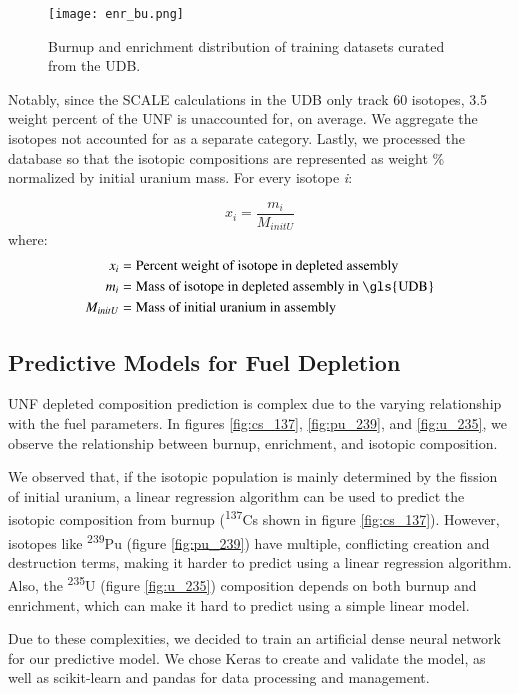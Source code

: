 \begin{figure}
    \centering
    \texttt{[image: enr\_bu.png]}
    \caption{Burnup and enrichment distribution of training
             datasets curated from the \gls{UDB}.}
    \label{fig:enr_bu}
\end{figure}


Notably, since the SCALE calculations in the \gls{UDB} only track 60 isotopes,
3.5 weight percent of the \gls{UNF} is unaccounted for, on average. We
aggregate the isotopes not accounted for as a separate category. Lastly,
we processed the database so that the isotopic compositions are 
represented as weight \% normalized by initial uranium mass.
For every isotope \textit{i}:

\begin{equation}
x_i = \frac{m_i}{M_{initU}}
\end{equation}
where:
\begin{align*}
x_i &= \text{Percent weight of isotope in depleted assembly}\\
m_i &= \text{Mass of isotope in depleted assembly in \gls{UDB}}\\
M_{initU} &= \text{Mass of initial uranium in assembly}
\end{align*}


\subsection{Predictive Models for Fuel Depletion}

\gls{UNF} depleted composition prediction is complex
due to the varying relationship with the fuel parameters.
In figures \ref{fig:cs_137}, \ref{fig:pu_239}, and \ref{fig:u_235},
we observe the relationship between
burnup, enrichment, and isotopic composition.

We observed that, if the isotopic population is mainly determined by
the fission of initial uranium, a linear regression algorithm
can be used to predict the isotopic composition from burnup
(\textsuperscript{137}Cs shown in figure \ref{fig:cs_137}).
However, isotopes like \textsuperscript{239}Pu (figure \ref{fig:pu_239}) have multiple, conflicting creation
and destruction terms, making it harder to predict using a
linear regression algorithm. Also, the \textsuperscript{235}U (figure \ref{fig:u_235})
composition
depends on both burnup and enrichment, which can make it
hard to predict using a simple linear model.

Due to these complexities, we decided to train an artificial
dense neural network for our predictive model. We chose
Keras \cite{collet_keras_2015} to create and validate the model,
as well as scikit-learn \cite{pedregosa_scikit-learn_2011}
and pandas \cite{mckinney-proc-scipy-2010} for data processing and management.

